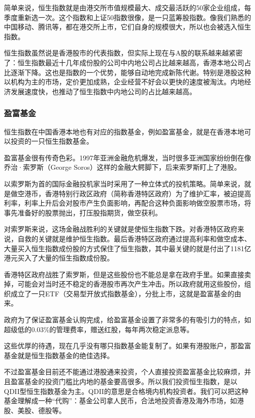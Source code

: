 简单来说，恒生指数就是由港交所市值规模最大、成交最活跃的50家企业组成，每季度重新选一次。这个指数和上证50指数很像，是一只蓝筹股指数。像我们熟悉的中国移动、腾讯等，都在港交所上市，它们自身的规模很大，所以也会被选入恒生指数。

恒生指数虽然说是香港股市的代表指数，但实际上现在与A股的联系越来越紧密了：恒生指数最近十几年成份股的公司中内地公司占比越来越高，香港本地公司占比逐渐下降。这也是指数的一个优势，能够自动地完成新陈代谢。特别是港股这种以机构为主的市场，定价更加成熟，企业经营不好会以更快的速度被淘汰。内地经济发展速度快，也推动了恒生指数中内地公司的占比越来越高。

\subsubsection{盈富基金}

恒生指数在中国香港本地也有对应的指数基金，例如盈富基金，就是在香港本地可以投资的一只恒生指数基金。

盈富基金很有传奇色彩。1997年亚洲金融危机爆发，当时很多亚洲国家纷纷倒在像乔治·索罗斯（George Soros）这样的金融大鳄脚下，后来索罗斯盯上了港股。

以索罗斯为首的国际金融投机家当时采用了一种立体式的投机策略。简单来说，就是做空港币，香港特别行政区政府（简称香港特区政府）为了维护汇率，被迫提高利率，利率上升后会对股市产生负面影响，再配合这种负面影响做空股票市场，将事先准备好的股票抛出，打压股指期货，做空获利。

对索罗斯来说，这场金融战胜利的关键就是使恒生指数下跌。对香港特区政府来说，自救的关键就是维护恒生指数。最后香港特区政府通过提高利率和做空成本、大量买入恒生指数成份股的方式保住了恒生指数，其中最关键的就是付出了1181亿港元买入了大量的恒生指数成份股。

香港特区政府战胜了索罗斯，但是这些股份也不能总是拿在政府手里。如果直接卖掉，可能会对当时还不稳定的香港股市再次产生冲击。所以政府就用这些股份，组织成立了一只ETF（交易型开放式指数基金），分批上市，这就是盈富基金的由来。

政府为了保证盈富基金认购完成，给盈富基金设置了非常多的有吸引力的特点，如超级低的0.03\%的管理费率，赠送红股，每年两次稳定派息等。

这些优厚的待遇，现在几乎没有哪只指数基金能复制了。如果有港股账户，那盈富基金就是恒生指数基金的绝佳选择。

不过盈富基金目前还不能通过港股通来投资，个人直接投资盈富基金比较麻烦，并且盈富基金的投资门槛比内地的基金要高很多。所以我们投资恒生指数，是以QDII型恒生指数基金为主。QDII的意思是合格境内机构投资者。我们可以把这种基金理解成一种“代购”：基金公司拿人民币，合法地投资香港及海外市场，如港股、美股、德股等。

